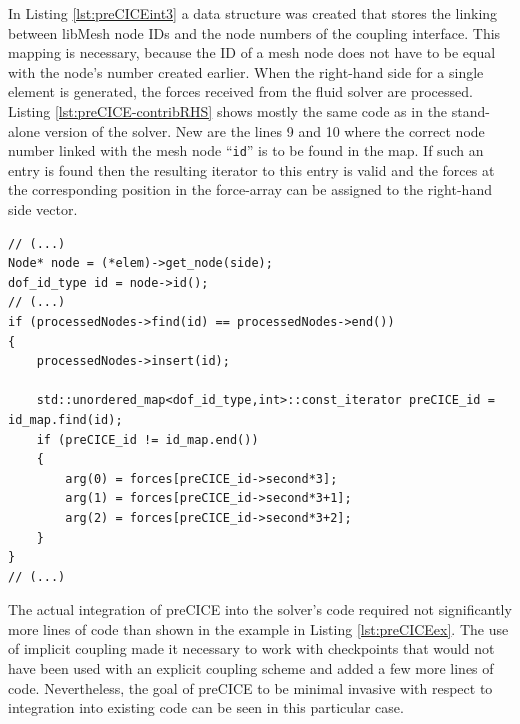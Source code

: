    In Listing \ref{lst:preCICEint3} a data structure was created that stores the linking between libMesh node IDs and the node numbers of the coupling interface. This mapping is necessary, because the ID of a mesh node does not have to be equal with the node's number created earlier. When the right-hand side for a single element is generated, the forces received from the fluid solver are processed. Listing \ref{lst:preCICE-contribRHS} shows mostly the same code as in the stand-alone version of the solver. New are the lines 9 and 10 where the correct node number linked with the mesh node ``\texttt{id}'' is to be found in the map. If such an entry is found then the resulting iterator to this entry is valid and the forces at the corresponding position in the force-array can be assigned to the right-hand side vector.
\begin{lstlisting}[caption=Modification of contribRHS-function,label=lst:preCICE-contribRHS,keepspaces=true]
// (...)
Node* node = (*elem)->get_node(side);
dof_id_type id = node->id();
// (...)
if (processedNodes->find(id) == processedNodes->end())
{
	processedNodes->insert(id);

	std::unordered_map<dof_id_type,int>::const_iterator preCICE_id = id_map.find(id);
	if (preCICE_id != id_map.end())
	{
		arg(0) = forces[preCICE_id->second*3];
		arg(1) = forces[preCICE_id->second*3+1];
		arg(2) = forces[preCICE_id->second*3+2];
	}
}
// (...)
\end{lstlisting}   
The actual integration of preCICE into the solver's code required not significantly more lines of code than shown in the example in Listing \ref{lst:preCICEex}. The use of implicit coupling made it necessary to work with checkpoints that would not have been used with an explicit coupling scheme and added a few more lines of code. Nevertheless, the goal of preCICE to be minimal invasive with respect to integration into existing code can be seen in this particular case.